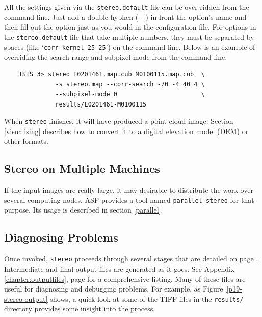 All the settings given via the \texttt{stereo.default} file can be
over-ridden from the command line. Just add a double hyphen
(\texttt{-\/-}) in front the option's name and then fill out the option
just as you would in the configuration file. For options in the
\texttt{stereo.default} file that take multiple numbers, they must be
separated by spaces (like `\texttt{corr-kernel~25~25}') on the command
line. Below is an example of overriding the search range and subpixel
mode from the command line.

\begin{verbatim}
    ISIS 3> stereo E0201461.map.cub M0100115.map.cub  \
              -s stereo.map --corr-search -70 -4 40 4 \
              --subpixel-mode 0                       \
              results/E0201461-M0100115
\end{verbatim}

When \texttt{stereo} finishes, it will have produced a point cloud
image. Section \ref{visualising} describes how to convert it to a
digital elevation model (DEM) or other formats.

\subsection{Stereo on Multiple Machines}

If the input images are really large, it may desirable to distribute the
work over several computing nodes. ASP provides a tool named
\texttt{parallel\_stereo} for that purpose. Its usage is described in section
\ref{parallel}.

\subsection{Diagnosing Problems}

Once invoked, \texttt{stereo} proceeds through several stages that are
detailed on page \pageref{entrypoints}.  Intermediate and final output
files are generated as it goes.  See Appendix
\ref{chapter:outputfiles}, page \pageref{chapter:outputfiles} for a
comprehensive listing.  Many of these files are useful for diagnosing and
debugging problems.  For example, as Figure~\ref{p19-stereo-output}
shows, a quick look at some of the TIFF files in the \texttt{results/}
directory provides some insight into the process.

